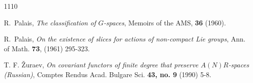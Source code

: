 \documentclass{amsart}
\begin{document}
\begin{thebibliography}{1110}





 R.~Palais, {\em  The classification of $G$-spaces}, Memoirs of the AMS, {\bf 36} (1960).

 R.~Palais,
{\em  On the existence of slices for actions of non-compact Lie groups},
Ann. of Math. {\bf  73}, (1961)  295-323.

  T. F. \v Zuraev, {\em On covariant functors of finite degree that preserve $A(N)R$-spaces (Russian)},  Comptes Rendus Acad. Bulgare Sci. {\bf 43, no. 9} (1990) 5-8.

\end{thebibliography}

\end{document}
